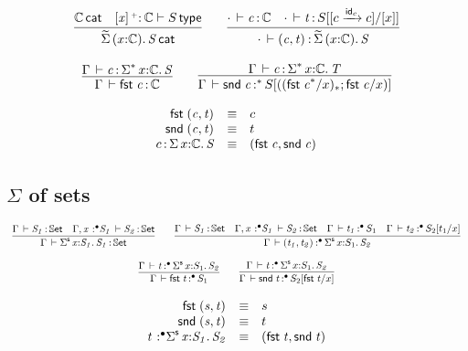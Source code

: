 \documentclass[11pt]{article}
\theoremstyle{plain}
\begin{document}
\[
\begin{array}{c}
\infer{\wfdtp{\sigmatwcat{x}{\C}{S}}}
      {\wfdtp{\C} &
        \wftp{\twcatvar{x}{\co}{\C}}{S}}
\qquad
\infer{\ofdtp{\cdot}{\pair{c}{t}}{\sigmatwcat x \C S}}
      {\ofdtp{\cdot}{c}{\C} &
       \oftp{\cdot}{t}{S[\substtw{c}{c}{\idm c}{x}]}}
\\ \\
\infer{\ofdtp{\Gamma}{\fst c}{\C}}
      {\ofdtp{\Gamma}{c}{\sigmacatstar{\vcond}{x}{\C}{S}}}
\qquad
\infer{\oftpe{\Gamma}{\snd c}{\vcond}{\tsubst{S}{\substdup{(\fst c^\vcond / x)}{\vcond}{\fst c/x}}}}
      {\ofdtp{\Gamma}{c}{\sigmacatstar{\vcond}{x}{\C}{T}}}
\end{array}
\]

\[
\begin{array}{rcll}
\mathit{\mathsf{fst}_{} \: \mathit{(c,t)_{}}} & \equiv & c \\
\mathit{\mathsf{snd}_{} \: \mathit{(c,t)_{}}} & \equiv & t \\
c \, \mathit{:} \, \textnormal{$\Sigma$}\,x \mathit{:} \mathbb{C}.\,\mathit{S} & \equiv & \mathit{(\mathit{\mathsf{fst}_{} \: c},\mathit{\mathsf{snd}_{} \: c})_{}}
\end{array}
\]

\subsection{$\Sigma$ of sets}

\[
\begin{array}{c}
\infer{\ofdtp{\Gamma}{\sigmaset{x}{S_1}{S_1}}{\types}}
      {\ofdtp{\Gamma}{S_1}{\types} &
        \ofdtp{\Gamma, \tpvar{x}{\bullet}{{S_1}}}{S_2}{\types}}
\qquad
\infer{\oftpe{\Gamma}{\pair{t_1}{t_2}}{\bullet}{\sigmaset x {S_1} {S_2}}}
      {\ofdtp{\Gamma}{S_1}{\types} &
        \ofdtp{\Gamma, \tpvar{x}{\bullet}{{S_1}}}{S_2}{\types} &
        \oftpe{\Gamma}{t_1}{\bullet}{S_1} &
        \oftpe{\Gamma}{t_2}{\bullet}{\subst{S_2}{t_1}x}}
\\ \\
\infer{\oftpe{\Gamma}{\fst t}{\bullet}{{S_1}}}
      {\oftpe{\Gamma}{t}{\bullet}{\sigmaset{x}{S_1}{S_2}}}
\qquad
\infer{\oftpe{\Gamma}{\snd t}{\bullet}{\subst{S_2}{\fst t}{x}}}
      {\oftpe{\Gamma}{t}{\bullet}{\sigmaset{x}{S_1}{S_2}}}
\end{array}
\]


\[
\begin{array}{rcll}
\mathit{\mathsf{fst}_{} \: \mathit{(s,t)_{}}} & \equiv & s \\
\mathit{\mathsf{snd}_{} \: \mathit{(s,t)_{}}} & \equiv & t \\
\mathit{t} \,^{\,}{:}^{\bullet} \mathit{\textnormal{$\Sigma$}^{\mathsf{s}}\,x \mathit{:} S_1.\,\mathit{S_2}} & \equiv & \mathit{(\mathit{\mathsf{fst}_{} \: t},\mathit{\mathsf{snd}_{} \: t})_{}}
\end{array}
\]
\end{document}
